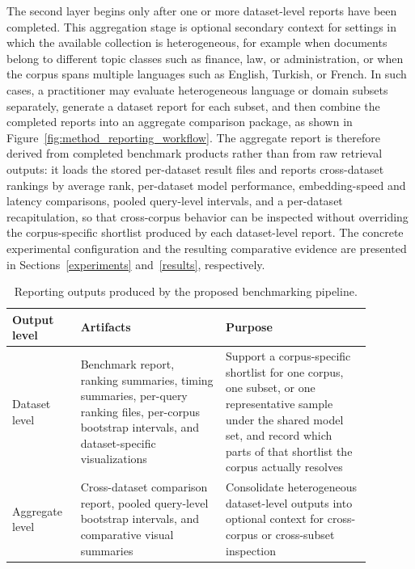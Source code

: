 The second layer begins only after one or more dataset-level reports have been completed. This aggregation stage is optional secondary context for settings in which the available collection is heterogeneous, for example when documents belong to different topic classes such as finance, law, or administration, or when the corpus spans multiple languages such as English, Turkish, or French. In such cases, a practitioner may evaluate heterogeneous language or domain subsets separately, generate a dataset report for each subset, and then combine the completed reports into an aggregate comparison package, as shown in Figure~\ref{fig:method_reporting_workflow}. The aggregate report is therefore derived from completed benchmark products rather than from raw retrieval outputs: it loads the stored per-dataset result files and reports cross-dataset rankings by average rank, per-dataset model performance, embedding-speed and latency comparisons, pooled query-level intervals, and a per-dataset recapitulation, so that cross-corpus behavior can be inspected without overriding the corpus-specific shortlist produced by each dataset-level report. The concrete experimental configuration and the resulting comparative evidence are presented in Sections~\ref{experiments} and~\ref{results}, respectively.

\begin{table}[htbp]
\caption{Reporting outputs produced by the proposed benchmarking pipeline.}\label{tbl:method_reporting_outputs}
\centering
\small
\begin{tabular}{@{}>{\raggedright\arraybackslash}p{0.16\linewidth}>{\raggedright\arraybackslash}p{0.36\linewidth}>{\raggedright\arraybackslash}p{0.36\linewidth}@{}}
\toprule
Output level & Artifacts & Purpose \\
\midrule
Dataset level & Benchmark report, ranking summaries, timing summaries, per-query ranking files, per-corpus bootstrap intervals, and dataset-specific visualizations & Support a corpus-specific shortlist for one corpus, one subset, or one representative sample under the shared model set, and record which parts of that shortlist the corpus actually resolves \\
Aggregate level & Cross-dataset comparison report, pooled query-level bootstrap intervals, and comparative visual summaries & Consolidate heterogeneous dataset-level outputs into optional context for cross-corpus or cross-subset inspection \\
\bottomrule
\end{tabular}
\end{table}

